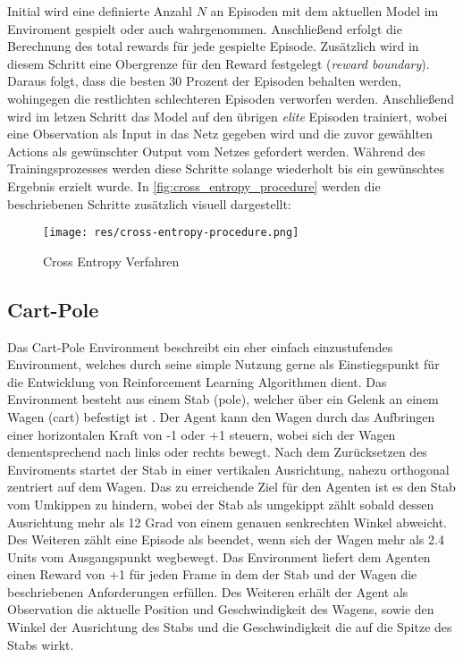 \documentclass[11pt]{scrartcl}
\begin{document}
Initial wird eine definierte Anzahl $N$ an Episoden mit dem aktuellen Model im Enviroment gespielt
oder auch wahrgenommen. Anschließend erfolgt die Berechnung des total rewards für jede gespielte
Episode. Zusätzlich wird in diesem Schritt eine Obergrenze für den Reward festgelegt 
(\textit{reward boundary}). Daraus folgt, dass die besten 30 Prozent der Episoden behalten werden,
wohingegen die restlichten schlechteren Episoden verworfen werden. Anschließend wird im letzen Schritt
das Model auf den übrigen \textit{elite} Episoden trainiert, wobei eine Observation als Input in das
Netz gegeben wird und die zuvor gewählten Actions als gewünschter Output vom Netzes gefordert werden.
Während des Trainingsprozesses werden diese Schritte solange wiederholt bis ein gewünschtes
Ergebnis erzielt wurde. In \autoref{fig:cross_entropy_procedure} werden die beschriebenen Schritte
zusätzlich visuell dargestellt:

\begin{figure}[htp]
\centering
\texttt{[image: res/cross-entropy-procedure.png]}
\caption{Cross Entropy Verfahren}
\label{fig:cross_entropy_procedure}
\end{figure}

\subsection{Cart-Pole}
Das Cart-Pole Environment beschreibt ein eher einfach einzustufendes Environment, welches durch seine
simple Nutzung gerne als Einstiegspunkt für die Entwicklung von Reinforcement Learning Algorithmen 
dient. Das Environment besteht aus einem Stab (pole), welcher über ein Gelenk an einem Wagen (cart) 
befestigt ist \cite{OAI2016_2}. Der Agent kann den Wagen durch das Aufbringen einer horizontalen Kraft 
von -1 oder +1 steuern, wobei sich der Wagen dementsprechend nach links oder rechts bewegt. Nach 
dem Zurücksetzen des Enviroments startet der Stab in einer vertikalen Ausrichtung, nahezu orthogonal
zentriert auf dem Wagen. Das zu erreichende Ziel für den Agenten ist es den Stab vom Umkippen zu hindern,
wobei der Stab als umgekippt zählt sobald dessen Ausrichtung mehr als 12 Grad von einem genauen
senkrechten Winkel abweicht. Des Weiteren zählt eine Episode als beendet, wenn sich der Wagen mehr
als 2.4 Units vom Ausgangspunkt wegbewegt. Das Environment liefert dem Agenten einen Reward von +1
für jeden Frame in dem der Stab und der Wagen die beschriebenen Anforderungen erfüllen. Des Weiteren
erhält der Agent als Observation die aktuelle Position und Geschwindigkeit des Wagens, sowie den Winkel
der Ausrichtung des Stabs und die Geschwindigkeit die auf die Spitze des Stabs wirkt.
\end{document}
